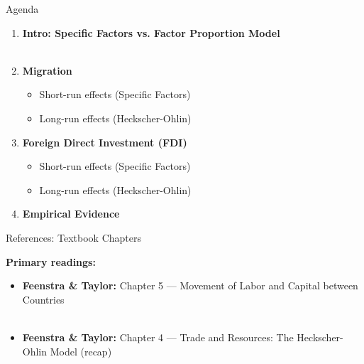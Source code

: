 \documentclass{beamer}
\begin{document}

\begin{frame}{Agenda}

\begin{enumerate}
    \item \textbf{Intro: Specific Factors vs. Factor Proportion Model} \\~\\

    \item \textbf{Migration}
    \begin{itemize}
        \item Short-run effects (Specific Factors)
        \item Long-run effects (Heckscher-Ohlin)
    \end{itemize}

    \vspace{0.3cm}

    \item \textbf{Foreign Direct Investment (FDI)}
    \begin{itemize}
        \item Short-run effects (Specific Factors)
        \item Long-run effects (Heckscher-Ohlin)
    \end{itemize}

    \vspace{0.3cm}

    \item \textbf{Empirical Evidence}
\end{enumerate}

\end{frame}


\begin{frame}{References: Textbook Chapters}

\textbf{Primary readings:}
\begin{itemize}
    \item \textbf{Feenstra \& Taylor:} Chapter 5 --- Movement of Labor and Capital between Countries \\~\\
    \item \textbf{Feenstra \& Taylor:} Chapter 4 --- Trade and Resources: The Heckscher-Ohlin Model (recap)
\end{itemize}

\end{frame}
\end{document}
